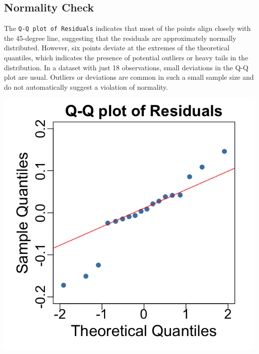 \documentclass[
  12pt,
]{article}
\begin{document}
\vspace{-1em}

\subsection{Normality Check}\label{normality-check}

\noindent

\begin{minipage}{0.65\textwidth}
\justifying

The \texttt{Q-Q plot of Residuals} indicates that most of the points align closely with the 45-degree line, suggesting that the residuals are approximately normally distributed. However, six points deviate at the extremes of the theoretical quantiles, which indicates the presence of potential outliers or heavy tails in the distribution. In a dataset with just 18 observations, small deviations in the Q-Q plot are usual. Outliers or deviations are common in such a small sample size and do not automatically suggest a violation of normality.
\end{minipage}
\hfill
\begin{minipage}{0.33\textwidth}
\centering
\vspace{-2em}  %
\includegraphics[width=0.9\linewidth]{figures/qqplot_residuals.png}
\vspace{-1em}     %
\end{minipage}
\end{document}
